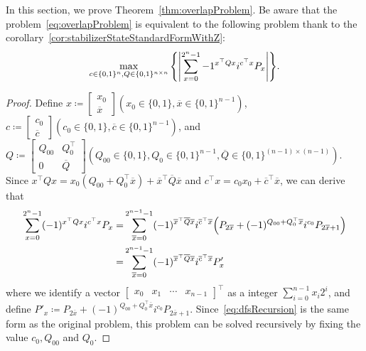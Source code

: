 \documentclass[a4paper, onecolumn, 11pt, longbibliography]{quantumarticle}
\newcommand{\defeq}{\coloneqq}
\begin{document}
In this section, we prove Theorem~\ref{thm:overlapProblem}.
Be aware that the problem~\eqref{eq:overlapProblem}
is equivalent to the following problem thank to the corollary~\ref{cor:stabilizerStateStandardFormWithZ}:
\begin{equation*}
  \max_{c\in \{0,1\}^n, Q\in \{0,1\}^{n \times n}} \qty{ \abs{\sum_{x=0}^{2^n-1} -1^{x^\top Q x} i^{c^\top x} P_x} }.
\end{equation*}
\overlapProblem*
\begin{proof}
  Define $x \defeq \begin{bmatrix}
      x_0 \\
      \overline{x}
    \end{bmatrix} (x_0 \in \{0,1\}, \overline{x} \in \{0,1\}^{n-1})$,
  $c \defeq \begin{bmatrix}
      c_0 \\
      \overline{c}
    \end{bmatrix} (c_0 \in \{0,1\}, \overline{c} \in \{0,1\}^{n-1})$, and
  $Q \defeq \begin{bmatrix}
      Q_{00} & Q_{0}^\top   \\
      0      & \overline{Q}
    \end{bmatrix} (Q_{00} \in \{0,1\}, Q_0 \in \{0,1\}^{n-1}, \overline{Q} \in \{0,1\}^{(n-1) \times (n-1)})$.
  Since
  $x^\top Q x = x_0 (Q_{00}+Q_0^\top \overline{x}) + \overline{x}^\top \overline{Q} \overline{x}$
  and
  $c^\top x = c_0 x_0 + \overline{c}^\top \overline{x}$,
  we can derive that
  \begin{align}
    \sum_{x=0}^{2^n-1} (-1)^{x^\top Q x} i^{c^\top x} P_x
    = & \sum_{\overline{x}=0}^{2^{n-1}-1} (-1)^{\overline{x}^\top \overline{Q} \overline{x}} i^{\overline{c}^\top \overline{x}}
    \qty(P_{2\overline{x}} + (-1)^{Q_{00}+Q_0^\top \overline{x}} i^{c_0} P_{2\overline{x}+1})                                   \notag                       \\
    = & \sum_{\overline{x}=0}^{2^{n-1}-1} (-1)^{\overline{x}^\top \overline{Q} \overline{x}} i^{\overline{c}^\top \overline{x}} P'_x \label{eq:dfsRecursion}
  \end{align}
  where we identify a vector
  $\begin{bmatrix}
      x_0 & x_1 & \cdots & x_{n-1}
    \end{bmatrix}^\top$
  as a integer $\sum_{i=0}^{n-1} x_i 2^i$,
  and define
  $P'_x \defeq P_{2\overline{x}} + (-1)^{Q_{00}+Q_0^\top \overline{x}} i^{c_0} P_{2\overline{x}+1}$.
  Since~\eqref{eq:dfsRecursion} is the same form as the original problem, this problem can be solved recursively
  by fixing the value $c_0,Q_{00}$ and $Q_0$.


\end{proof}
\end{document}
